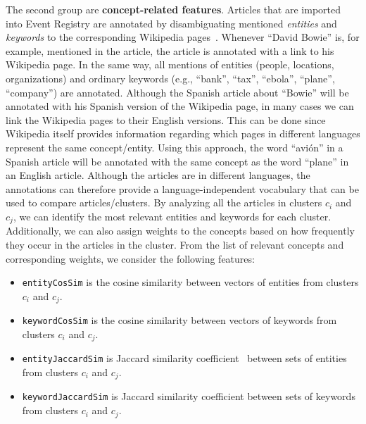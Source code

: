 The second group are {\bf concept-related features}. Articles that are imported into Event Registry
are annotated by disambiguating mentioned \emph{entities} and \emph{keywords} to the corresponding
Wikipedia pages~\cite{zhang2014}. Whenever ``David Bowie'' is, for example, mentioned in the article,
the article is annotated with a link to his Wikipedia page. In the same way, all mentions of
entities (people, locations, organizations) and ordinary keywords (e.g., ``bank'', ``tax'', ``ebola'', ``plane'', ``company'')
are annotated. Although the Spanish article about ``Bowie'' will be annotated with his Spanish
version of the Wikipedia page, in many cases we can link the Wikipedia pages to their English
versions. This can be done since Wikipedia itself provides information regarding which pages
in different languages represent the same concept/entity. Using this approach, the word ``avi\'on''
in a Spanish article will be annotated with the same concept as the word ``plane'' in an English article.
Although the articles are in different languages, the annotations can therefore provide a language-independent
vocabulary that can be used to compare articles/clusters. By analyzing all the articles in
clusters $c_i$ and $c_j$, we can identify the most relevant entities and keywords for each cluster.
Additionally, we can also assign weights to the concepts based on how frequently they occur in the
articles in the cluster. From the list of relevant concepts and corresponding weights, we consider
the following features:

\begin{itemize}
\item \texttt{entityCosSim} is the cosine similarity between vectors of entities from clusters $c_i$ and $c_j$.
\item \texttt{keywordCosSim} is the cosine similarity between vectors of keywords from clusters $c_i$ and $c_j$.
\item \texttt{entityJaccardSim} is  Jaccard similarity coefficient~\cite{levandowsky1971} between sets of entities from clusters $c_i$ and $c_j$.
\item \texttt{keywordJaccardSim} is  Jaccard similarity coefficient between sets of keywords from clusters $c_i$ and $c_j$.
\end{itemize}

